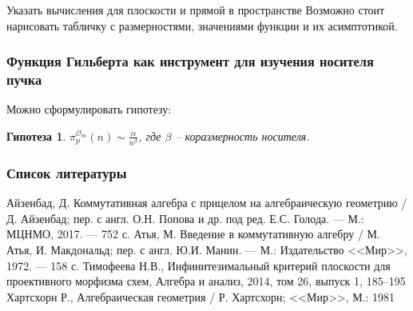 \documentclass{beamer}
\newtheorem{rhyp}{Гипотеза}
\newcommand{\OO}{\mathcal{O}}
\begin{document}
    \begin{frame}{Указать вычисления для плоскости и прямой в пространстве}
        Возможно стоит нарисовать табличку с размерностями, значениями функции и их асимптотикой.
    \end{frame}

    \begin{frame}
        \frametitle{Функция Гильберта как инструмент для изучения носителя пучка}
    
        Можно сформулировать гипотезу: 
        \begin{rhyp}
            $\pi^{\OO_m}_p(n) \sim \frac{\alpha}{n^\beta}$, 
            где $\beta$ -- коразмерность носителя.
        \end{rhyp}
    \end{frame}

    \frame[plain]{\titlepage}

    \begin{frame}
        \frametitle{Список литературы}
        \begin{thebibliography}{00}
            Айзенбад, Д. Коммутативная алгебра с прицелом на алгебраическую геометрию / Д. Айзенбад; пер. с англ. О.Н. Попова и др. под ред. Е.С. Голода. --- М.: МЦНМО, 2017. --- 752 с.
            Атья, М. Введение в коммутативную алгебру / М. Атья, И. Макдональд; пер. с англ. Ю.И. Манин. --- М.: Издательство <<Мир>>, 1972. --- 158 с.
            Тимофеева Н.В., Инфинитезимальный критерий плоскости для проективного морфизма схем, Алгебра и анализ, 2014, том 26, выпуск 1, 185–195
            Хартсхорн Р., Алгебраическая геометрия / Р. Хартсхорн; <<Мир>>, М.: 1981
        \end{thebibliography}
    \end{frame}

    
\end{document}
